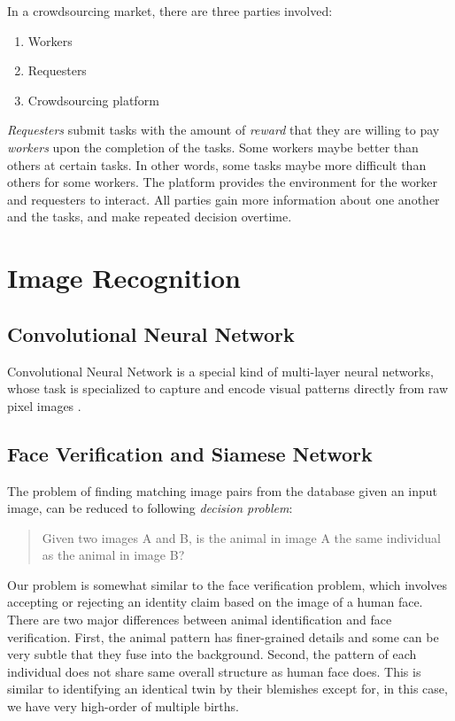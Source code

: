 In a crowdsourcing market, there are three parties involved:
\begin{enumerate}
	\item Workers
	\item Requesters
	\item Crowdsourcing platform
\end{enumerate}
\emph{Requesters} submit tasks with the amount of \emph{reward} that they are willing to pay \emph{workers} upon the completion of the tasks. Some workers maybe better than others at certain tasks. In other words, some tasks maybe more difficult than others for some workers. The platform provides the environment for the worker and requesters to interact. All parties gain more information about one another and the tasks, and make repeated decision overtime.

\section{Image Recognition}

\subsection{Convolutional Neural Network}

Convolutional Neural Network is a special kind of multi-layer neural networks, whose task is specialized to capture and encode visual patterns directly from raw pixel images \cite{lecun95}. 

\subsection{Face Verification and Siamese Network}

The problem of finding matching image pairs from the database given an input image, can be reduced to following \emph{decision problem}:
\begin{quote}
\centering
Given two images A and B, is the animal in image A the same individual as the animal in image B?
\end{quote}

Our problem is somewhat similar to the face verification problem, which involves accepting or rejecting an identity claim based on the image of a human face. There are two major differences between animal identification and face verification. First, the animal pattern has finer-grained details and some can be very subtle that they fuse into the background. Second, the pattern of each individual does not share same overall structure as human face does. This is similar to identifying an identical twin by their blemishes except for, in this case, we have very high-order of multiple births.

